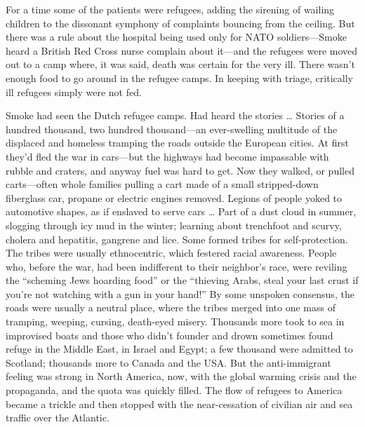 For a time some of the patients were refugees, adding the sirening of wailing children to the dissonant symphony of complaints bouncing from the ceiling. But there was a rule about the hospital being used only for NATO soldiers—Smoke heard a British Red Cross nurse complain about it—and the refugees were moved out to a camp where, it was said, death was certain for the very ill. There wasn’t enough food to go around in the refugee camps. In keeping with triage, critically ill refugees simply were not fed.

Smoke had seen the Dutch refugee camps. Had heard the stories … Stories of a hundred thousand, two hundred thousand—an ever-swelling multitude of the displaced and homeless tramping the roads outside the European cities. At first they’d fled the war in cars—but the highways had become impassable with rubble and craters, and anyway fuel was hard to get. Now they walked, or pulled carts—often whole families pulling a cart made of a small stripped-down fiberglass car, propane or electric engines removed. Legions of people yoked to automotive shapes, as if enslaved to serve cars … Part of a dust cloud in summer, slogging through icy mud in the winter; learning about trenchfoot and scurvy, cholera and hepatitis, gangrene and lice. Some formed tribes for self-protection. The tribes were usually ethnocentric, which festered racial awareness. People who, before the war, had been indifferent to their neighbor’s race, were reviling the “scheming Jews hoarding food” or the “thieving Arabs, steal your last crust if you’re not watching with a gun in your hand!” By some unspoken consensus, the roads were usually a neutral place, where the tribes merged into one mass of tramping, weeping, cursing, death-eyed misery. Thousands more took to sea in improvised boats and those who didn’t founder and drown sometimes found refuge in the Middle East, in Israel and Egypt; a few thousand were admitted to Scotland; thousands more to Canada and the USA. But the anti-immigrant feeling was strong in North America, now, with the global warming crisis and the propaganda, and the quota was quickly filled. The flow of refugees to America became a trickle and then stopped with the near-cessation of civilian air and sea traffic over the Atlantic.

